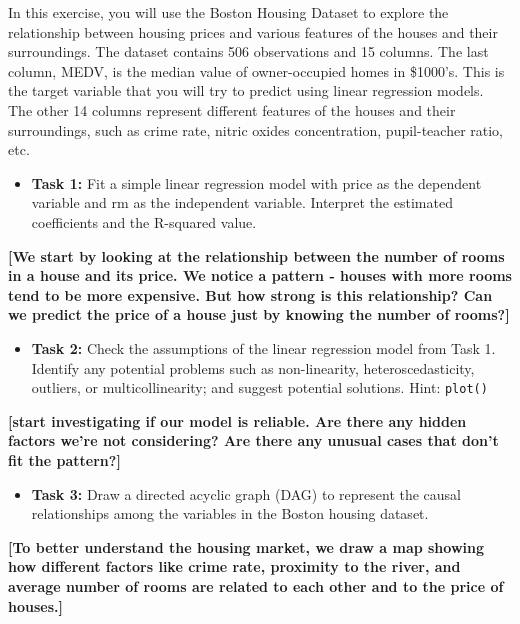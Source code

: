 \documentclass[
]{book}
\providecommand{\tightlist}{%
  \setlength{\itemsep}{0pt}\setlength{\parskip}{0pt}}
\begin{document}
In this exercise, you will use the Boston Housing Dataset to explore the relationship between housing prices and various features of the houses and their surroundings. The dataset contains 506 observations and 15 columns. The last column, MEDV, is the median value of owner-occupied homes in \$1000's. This is the target variable that you will try to predict using linear regression models. The other 14 columns represent different features of the houses and their surroundings, such as crime rate, nitric oxides concentration, pupil-teacher ratio, etc.

\begin{itemize}
\tightlist
\item
  \textbf{Task 1:} Fit a simple linear regression model with price as the dependent variable and rm as the independent variable. Interpret the estimated coefficients and the R-squared value.
\end{itemize}

\textbf{{[}We start by looking at the relationship between the number of rooms in a house and its price. We notice a pattern - houses with more rooms tend to be more expensive. But how strong is this relationship? Can we predict the price of a house just by knowing the number of rooms?{]}}

\begin{itemize}
\tightlist
\item
  \textbf{Task 2:} Check the assumptions of the linear regression model from Task 1. Identify any potential problems such as non-linearity, heteroscedasticity, outliers, or multicollinearity; and suggest potential solutions. Hint: \texttt{plot()}
\end{itemize}

\textbf{{[}start investigating if our model is reliable. Are there any hidden factors we're not considering? Are there any unusual cases that don't fit the pattern?{]}}

\begin{itemize}
\tightlist
\item
  \textbf{Task 3:} Draw a directed acyclic graph (DAG) to represent the causal relationships among the variables in the Boston housing dataset.
\end{itemize}

\textbf{{[}To better understand the housing market, we draw a map showing how different factors like crime rate, proximity to the river, and average number of rooms are related to each other and to the price of houses.{]}}
\end{document}
